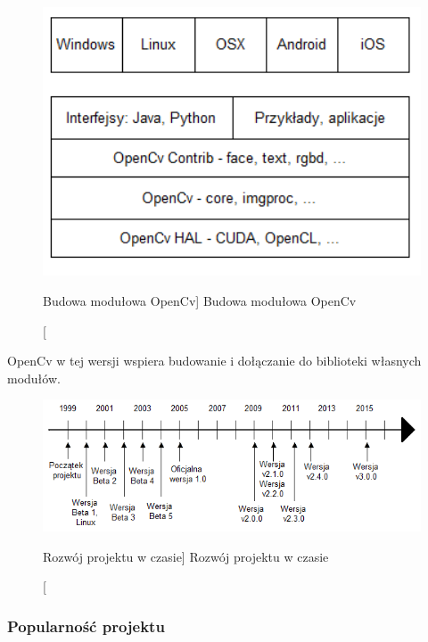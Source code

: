 \documentclass[a4paper,12pt]{article}
\begin{document}
				\begin{figure}[!ht]  
					\begin{center}
						\includegraphics[width=12cm] {image//openCvBudowa.png} 
					\end{center}
					\caption
					    [Budowa modułowa OpenCv]
					    {Budowa modułowa OpenCv}
				\end{figure}

				\par OpenCv w tej wersji wspiera budowanie i dołączanie do biblioteki własnych modułów.
	            
				\begin{figure}[!ht]   
					\begin{center}
		    				\includegraphics[width=\linewidth] {image//osCzasu.png} 
					\end{center}
					\caption
					    [Rozwój projektu w czasie]  
					    {Rozwój projektu w czasie}  
				\end{figure}


		\subsubsection{Popularność projektu}  
\end{document}
